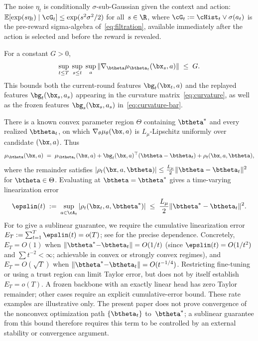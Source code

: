 \begin{assumption}\label{asm:noise}
The noise $\eta_t$ is conditionally $\sigma$-sub-Gaussian given the
context and action:
$\mathbb{E}[\exp(s\eta_t)\mid\cG_t]\le\exp(s^2\sigma^2/2)$
for all~$s\in\R$, where
$\cG_t := \cHist_t\vee\sigma(a_t)$ is the pre-reward sigma-algebra
of~\eqref{eq:filtration}, available immediately after the action is
selected and before the reward is revealed.
\end{assumption}

\begin{assumption}\label{asm:bounded}
For a constant $G>0$,
\[
  \sup_{t\le T}\;\sup_{s\le t}\;\sup_{a}
  \|\nabla_{\btheta}\mu_{\btheta_t}(\bx_s,a)\| \;\le\; G.
\]
This bounds both the current-round features
$\bg_t(\bx_t,a)$ and the replayed features
$\bg_t(\bx_s,a_s)$ appearing in the curvature
matrix~\eqref{eq:curvature}, as well as the frozen features
$\bg_s(\bx_s,a_s)$ in~\eqref{eq:curvature-bar}.
\end{assumption}

\begin{assumption}\label{asm:linear}
There is a known convex parameter region $\Theta$ containing
$\btheta^*$ and every realized $\btheta_t$, on which
$\nabla_\theta\mu_\theta(\bx,a)$ is $L_\mu$-Lipschitz uniformly over
candidate $(\bx,a)$.  Thus
\begin{equation}\label{eq:linearization}
  \mu_{\btheta}(\bx,a) \;=\;
    \mu_{\btheta_t}(\bx,a)
    + \bg_t(\bx,a)^\top(\btheta - \btheta_t)
    + \rho_t(\bx,a,\btheta),
\end{equation}
where the remainder satisfies
$|\rho_t(\bx,a,\btheta)| \le \tfrac{L_\mu}{2}\|\btheta-\btheta_t\|^2$
for $\btheta\in\Theta$.
Evaluating at $\btheta=\btheta^*$ gives a time-varying linearization error
\begin{equation}\label{eq:epslin-t}
  \epslin(t)
  \;:=\;
  \sup_{a\in\cA_t}|\rho_t(\bx_t,a,\btheta^*)|
  \;\le\;
  \frac{L_\mu}{2}\|\btheta^* - \btheta_t\|^2.
\end{equation}
For  to give a sublinear guarantee, we require the cumulative linearization
error $E_T:=\sum_{t=1}^{T}\epslin(t) = o(T)$; see 
for the precise dependence.  Concretely, $E_T=O(1)$ when
$\|\btheta^*{-}\btheta_t\|=O(1/t)$ (since
$\epslin(t)=O(1/t^2)$ and $\sum t^{-2}<\infty$;
achievable in convex or strongly convex regimes),
and $E_T=O(\sqrt{T})$ when
$\|\btheta^*{-}\btheta_t\|=O(t^{-1/4})$.
Restricting fine-tuning or using a trust region can limit Taylor error,
but does not by itself establish $E_T=o(T)$.  A frozen backbone with an
exactly linear head has zero Taylor remainder; other cases require an
explicit cumulative-error bound.
These rate examples are illustrative only.  The present paper does not
prove convergence of the nonconvex optimization path
$\{\btheta_t\}$ to~$\btheta^*$; a sublinear guarantee from this bound therefore
requires this term to be controlled by an external stability or convergence
argument.
\end{assumption}

